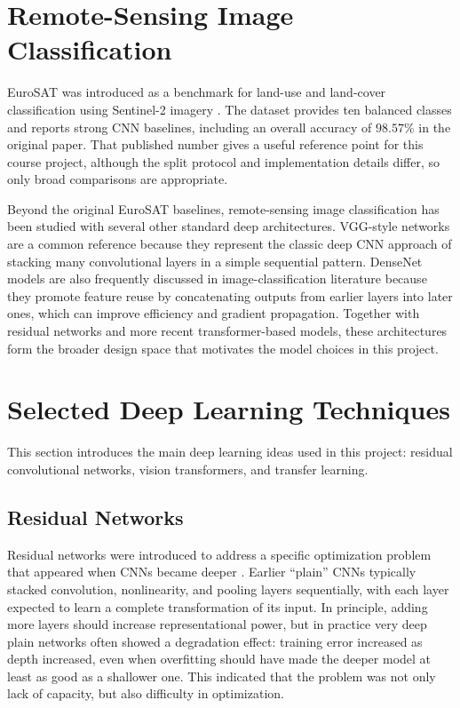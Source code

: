 \documentclass[11pt]{report}
\begin{document}
\section{Remote-Sensing Image Classification}
EuroSAT was introduced as a benchmark for land-use and land-cover classification using Sentinel-2 imagery \cite{helber2019}. The dataset provides ten balanced classes and reports strong CNN baselines, including an overall accuracy of \(98.57\%\) in the original paper. That published number gives a useful reference point for this course project, although the split protocol and implementation details differ, so only broad comparisons are appropriate.

Beyond the original EuroSAT baselines, remote-sensing image classification has been studied with several other standard deep architectures. VGG-style networks \cite{simonyan2015} are a common reference because they represent the classic deep CNN approach of stacking many convolutional layers in a simple sequential pattern. DenseNet models \cite{huang2017} are also frequently discussed in image-classification literature because they promote feature reuse by concatenating outputs from earlier layers into later ones, which can improve efficiency and gradient propagation. Together with residual networks and more recent transformer-based models, these architectures form the broader design space that motivates the model choices in this project.

\section{Selected Deep Learning Techniques}
\noindent This section introduces the main deep learning ideas used in this project: residual convolutional networks, vision transformers, and transfer learning.

\subsection{Residual Networks}
Residual networks were introduced to address a specific optimization problem that appeared when CNNs became deeper \cite{he2016}. Earlier ``plain'' CNNs typically stacked convolution, nonlinearity, and pooling layers sequentially, with each layer expected to learn a complete transformation of its input. In principle, adding more layers should increase representational power, but in practice very deep plain networks often showed a degradation effect: training error increased as depth increased, even when overfitting should have made the deeper model at least as good as a shallower one. This indicated that the problem was not only lack of capacity, but also difficulty in optimization.
\end{document}
